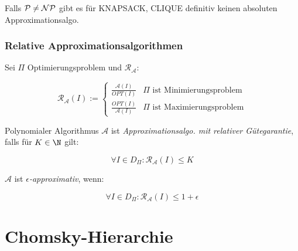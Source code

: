 Falls $\mathcal{P} \neq \mathcal{NP}$ gibt es für KNAPSACK, CLIQUE definitiv keinen absoluten Approximationsalgo.

\subsubsection*{Relative Approximationsalgorithmen}

Sei $\Pi$ Optimierungsproblem und $\mathcal{R_A}$:

\vspace*{-4mm}
\[ \mathcal{R_A}(I) := \begin{cases} \frac{\mathcal{A}(I)}{OPT(I)} & \Pi \text{ ist Minimierungsproblem} \\ \frac{OPT(I)}{\mathcal{A}(I)} & \Pi \text{ ist Maximierungsproblem} \end{cases} \]

Polynomialer Algorithmus $\mathcal{A}$ ist \emph{Approximationsalgo. mit relativer Gütegarantie}, falls für $K \in \N$ gilt:

\vspace*{-2mm}
\[ \forall I \in D_\Pi : \mathcal{R_A}(I) \leq K \]

$\mathcal{A}$ ist \emph{$\epsilon$-approximativ}, wenn:

\vspace*{-2mm}
\[ \forall I \in D_\Pi : \mathcal{R_A}(I) \leq 1 + \epsilon \]

\section*{Chomsky-Hierarchie}

